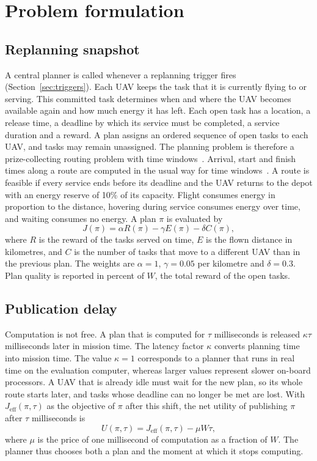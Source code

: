 \section{Problem formulation}\label{sec:problem}
\subsection{Replanning snapshot}
A central planner is called whenever a replanning trigger fires (Section~\ref{sec:triggers}). Each UAV keeps the task
that it is currently flying to or serving. This committed task determines when and where the UAV becomes available
again and how much energy it has left. Each open task has a location, a release time, a deadline by which its service
must be completed, a service duration and a reward. A plan assigns an ordered sequence of open tasks to each UAV, and
tasks may remain unassigned. The planning problem is therefore a prize-collecting routing problem with time
windows~\cite{solomon1987algorithms,vansteenwegen2011orienteering}. Arrival, start and finish times along a route are
computed in the usual way for time windows~\cite{solomon1987algorithms,savelsbergh1992vrptw}. A route is feasible if
every service ends before its deadline and the UAV returns to the depot with an energy reserve of 10\% of its capacity.
Flight consumes energy in proportion to the distance, hovering during service consumes energy over time, and waiting
consumes no energy. A plan $\pi$ is evaluated by
\begin{equation}
J(\pi)=\alpha R(\pi)-\gamma E(\pi)-\delta C(\pi),
\end{equation}
where $R$ is the reward of the tasks served on time, $E$ is the flown distance in kilometres, and $C$ is the number of
tasks that move to a different UAV than in the previous plan. The weights are $\alpha=1$, $\gamma=0.05$ per kilometre
and $\delta=0.3$. Plan quality is reported in percent of $W$, the total reward of the open tasks.

\subsection{Publication delay}
Computation is not free. A plan that is computed for $\tau$ milliseconds is released $\kappa\tau$ milliseconds later in
mission time. The latency factor $\kappa$ converts planning time into mission time. The value $\kappa=1$ corresponds to
a planner that runs in real time on the evaluation computer, whereas larger values represent slower on-board
processors. A UAV that is already idle must wait for the new plan, so its whole route starts later, and tasks whose
deadline can no longer be met are lost. With $J_{\mathrm{eff}}(\pi,\tau)$ as the objective of $\pi$ after this shift,
the net utility of publishing $\pi$ after $\tau$ milliseconds is
\begin{equation}
U(\pi,\tau)=J_{\mathrm{eff}}(\pi,\tau)-\mu W\tau,
\end{equation}
where $\mu$ is the price of one millisecond of computation as a fraction of $W$. The planner thus chooses both a plan
and the moment at which it stops computing.

